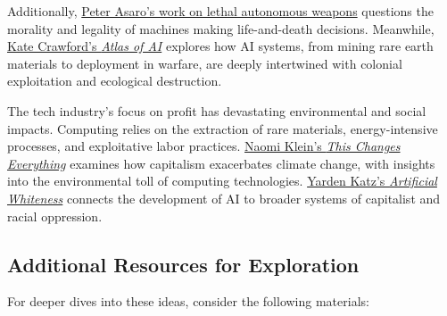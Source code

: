 \documentclass[11pt]{article}
\begin{document}
Additionally,
\href{https://peterasaro.org/writing/Asaro\%20Oxford\%20AI\%20Ethics\%20AWS.pdf}{Peter
Asaro's work on lethal autonomous weapons} questions the morality and
legality of machines making life-and-death decisions. Meanwhile,
\href{https://katecrawford.net/atlas}{Kate Crawford's \emph{Atlas of
AI}} explores how AI systems, from mining rare earth materials to
deployment in warfare, are deeply intertwined with colonial exploitation
and ecological destruction.

The tech industry's focus on profit has devastating environmental and
social impacts. Computing relies on the extraction of rare materials,
energy-intensive processes, and exploitative labor practices.
\href{https://thischangeseverything.org/}{Naomi Klein's \emph{This
Changes Everything}} examines how capitalism exacerbates climate change,
with insights into the environmental toll of computing technologies.
\href{https://cup.columbia.edu/book/artificial-whiteness/9780231194914}{Yarden
Katz's \emph{Artificial Whiteness}} connects the development of AI to
broader systems of capitalist and racial oppression.

    \subsection{Additional Resources for
Exploration}\label{additional-resources-for-exploration}

For deeper dives into these ideas, consider the following materials:
\end{document}
